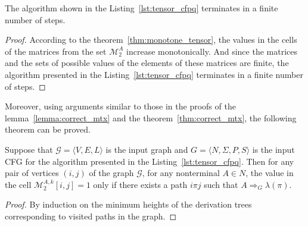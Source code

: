 \begin{theorem}\label{thm:finite_tensor}
	The algorithm shown in the Listing~\ref{lst:tensor_cfpq} terminates in a finite number of steps.
\end{theorem}
\begin{proof}
According to the theorem~\ref{thm:monotone_tensor}, the values in the cells of the matrices from the set $\mathcal{M}_2^{A}$ increase monotonically. And since the matrices and the sets of possible values of the elements of these matrices are finite, the algorithm presented in the Listing~\ref{lst:tensor_cfpq} terminates in a finite number of steps.
\end{proof}

Moreover, using arguments similar to those in the proofs of the lemma~\ref{lemma:correct_mtx} and the theorem~\ref{thm:correct_mtx}, the following theorem can be proved.

\begin{theorem}\label{thm:correct_tensor}
	Suppose that $\mathcal{G} = \langle V, E, L \rangle$ is the input graph and $G = \langle N, \Sigma, P, S \rangle$ is the input CFG for the algorithm presented in the Listing~\ref{lst:tensor_cfpq}. Then for any pair of vertices $(i, j)$ of the graph $\mathcal{G}$, for any nonterminal $A \in N$, the value in the cell $\mathcal{M}_2^{A, k}[i, j] = 1$ only if there exists a path $i \pi j$ such that $A \Rightarrow_G \lambda(\pi)$.
\end{theorem}
\begin{proof}
By induction on the minimum heights of the derivation trees corresponding to visited paths in the graph.
\end{proof}

